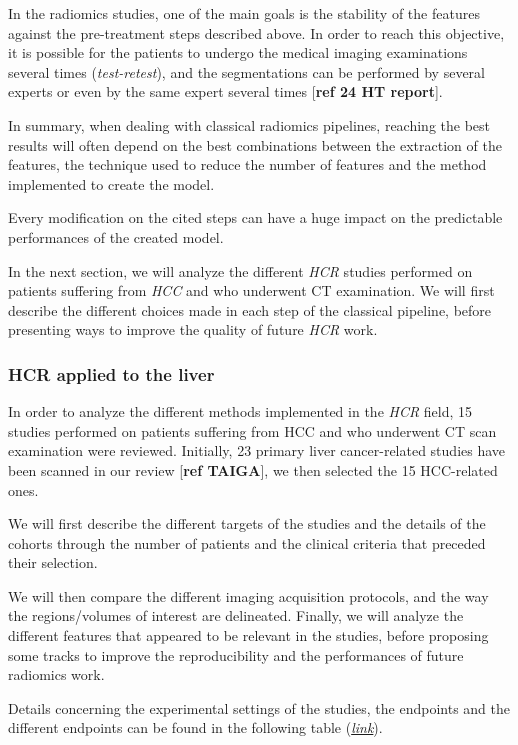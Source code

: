 \documentclass[]{article}
\begin{document}
In the radiomics studies, one of the main goals is the stability of the
features against the pre-treatment steps described above. In order to
reach this objective, it is possible for the patients to undergo the
medical imaging examinations several times (\emph{test-retest}), and the
segmentations can be performed by several experts or even by the same
expert several times {[}\textbf{ref 24 HT report}{]}.

In summary, when dealing with classical radiomics pipelines, reaching
the best results will often depend on the best combinations between the
extraction of the features, the technique used to reduce the number of
features and the method implemented to create the model.

Every modification on the cited steps can have a huge impact on the
predictable performances of the created model.

In the next section, we will analyze the different \emph{HCR} studies
performed on patients suffering from \emph{HCC} and who underwent CT
examination. We will first describe the different choices made in each
step of the classical pipeline, before presenting ways to improve the
quality of future \emph{HCR} work.

\subsubsection{HCR applied to the liver}\label{hcr-applied-to-the-liver}

In order to analyze the different methods implemented in the \emph{HCR}
field, 15 studies performed on patients suffering from HCC and who
underwent CT scan examination were reviewed. Initially, 23 primary liver
cancer-related studies have been scanned in our review {[}\textbf{ref
TAIGA}{]}, we then selected the 15 HCC-related ones.

We will first describe the different targets of the studies and the
details of the cohorts through the number of patients and the clinical
criteria that preceded their selection.

We will then compare the different imaging acquisition protocols, and
the way the regions/volumes of interest are delineated. Finally, we will
analyze the different features that appeared to be relevant in the
studies, before proposing some tracks to improve the reproducibility and
the performances of future radiomics work.

Details concerning the experimental settings of the studies, the
endpoints and the different endpoints can be found in the following
table
(\href{https://docs.google.com/spreadsheets/u/0/d/10EHNALN2_6ZavU7049n6CwTfJO_vd6WBod64u8YNbHg/edit}{\emph{link}}).
\end{document}

